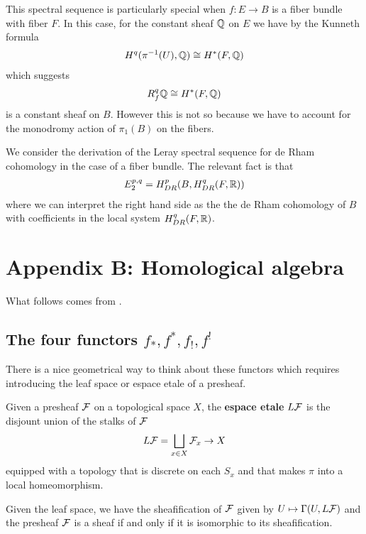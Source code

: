 \documentclass[12pt]{article}
\begin{document}
This spectral sequence is particularly special when $f:E\to B$ is a fiber bundle
with fiber $F$. In this case, for the constant sheaf $\mathbb{Q}$ on $E$ we have by
the Kunneth formula \begin{align*}
    H^q(\pi^{-1}(U),\mathbb{Q}) \cong H^*(F,\mathbb{Q})
\end{align*} which suggests \begin{align*}
    R^q_f\mathbb{Q} \cong H^*(F,\mathbb{Q})
\end{align*} is a constant sheaf on $B$. However this is not so
because we have to account for the monodromy action of $\pi_1(B)$ on the fibers.

\begin{example}
    We consider the derivation of the Leray spectral sequence for de Rham cohomology
    in the case of a fiber bundle. The relevant fact is that \begin{align*}
        E_2^{p,q} = H^p_{DR}(B,H^q_{DR}(F,\mathbb{R}))
    \end{align*} where we can interpret the right hand side as
    the the de Rham cohomology of $B$ with coefficients in the
    local system $H^q_{DR}(F,\mathbb{R})$.
\end{example}

\section{Appendix B: Homological algebra}
What follows comes from \cite{goresky}.
\subsection{The four functors $f_*,f^*,f_!,f^!$}
There is a nice geometrical way to think about these functors which requires
introducing the leaf space or espace etale of a presheaf.

\begin{definition}
    Given a presheaf ${\mathcal{F}}$ on a topological space $X$, the \textbf{espace etale} $L{\mathcal{F}}$
    is the disjount union of the stalks of ${\mathcal{F}}$ \begin{align*}
        L{\mathcal{F}} = \bigsqcup_{x\in X} {\mathcal{F}}_x \to X
    \end{align*} equipped with a topology that is discrete on each $S_x$ and that makes $\pi$ into
    a local homeomorphism.
\end{definition}

Given the leaf space, we have the sheafification of ${\mathcal{F}}$ given by $U \mapsto \Gamma(U,L{\mathcal{F}})$
and the presheaf ${\mathcal{F}}$ is a sheaf if and only if it is isomorphic to its sheafification.
\end{document}
